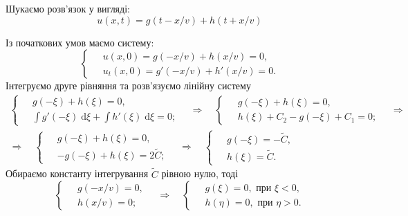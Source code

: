 Шукаємо розв'язок у вигляді:
\begin{equation}
    u(x,t) = g(t - x/v) + h(t + x/v)
\end{equation}

Із початкових умов маємо систему:
\begin{equation}
    \left\{ \begin{aligned}
        \;&u(x,0) = g(-x/v) + h(x/v) = 0,\\
        &u_t(x,0) = g'(-x/v) + h'(x/v) = 0.
\end{aligned} \right.
\end{equation}
Інтегруємо друге рівняння та розв'язуємо лінійну систему
\begin{equation*}
    \begin{gathered}
        \left\{ \begin{aligned}
            \;&g(-\xi) + h(\xi) = 0,\\
            &\int g'(-\xi)\;\mathrm{d}\xi + \int h'(\xi)\;\mathrm{d}\xi = 0;
        \end{aligned} \right.
        \quad\Rightarrow\quad
        \left\{ \begin{aligned}
            \;&g(-\xi) + h(\xi) = 0,\\
            &h(\xi) + C_2 - g(-\xi) + C_1 = 0;
        \end{aligned} \right.
        \quad\Rightarrow\\
        \Rightarrow\quad
        \left\{ \begin{aligned}
            \;&g(-\xi) + h(\xi) = 0,\\
            &-g(-\xi) + h(\xi) = 2\widetilde{C};
        \end{aligned} \right.
        \quad\Rightarrow\quad
        \left\{ \begin{aligned}
            \;&g(-\xi) = -\widetilde{C},\\
            &h(\xi) = \widetilde{C}.
        \end{aligned} \right.
    \end{gathered}
\end{equation*}
Обираємо константу інтегрування $\widetilde{C}$ рівною нулю, тоді 
\begin{equation*}
    \left\{ \begin{aligned}
        \;&g(-x/v) = 0,\\
        &h(x/v) = 0;
    \end{aligned} \right.
    \quad\Rightarrow\quad
    \left\{ \begin{aligned}
        \;&g(\xi) = 0, \text{ при } \xi < 0,\\
        &h(\eta)= 0, \text{ при } \eta > 0.
    \end{aligned} \right.
\end{equation*}

